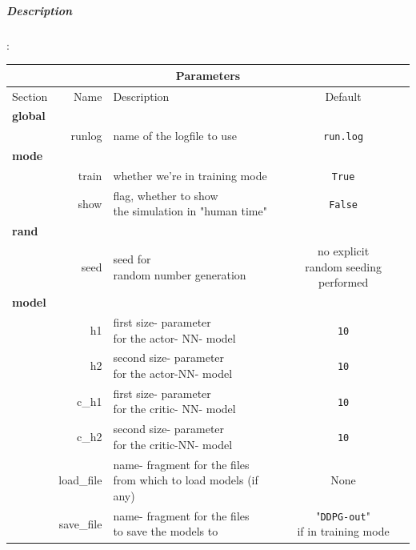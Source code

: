 \documentclass[a4paper]{article}
\begin{document}
\normalsize

\subparagraph{Description}
:\\
\small
\begin{tabular}{ |l|r|l|c| }
  \hline
  \multicolumn{4}{|c|}{Parameters} \\
  \hline
Section & Name & Description & Default \\
  \hline
\multicolumn{4}{|l|}{\textbf{global}} \\
               & runlog & name of the logfile to use & \texttt{run.log} \\
\multicolumn{4}{|l|}{\textbf{mode}} \\
               & train & whether we're in training mode & \texttt{True} \\
               & show & \makecell[tl]{flag, whether to show \\ the simulation in "human time"} & \texttt{False} \\
\multicolumn{4}{|l|}{\textbf{rand}} \\
               & seed & \makecell[tl]{seed for \\ random number generation} & \makecell[tc]{no explicit \\ random seeding performed} \\
\multicolumn{4}{|l|}{\textbf{model}} \\
               & h1 & \makecell[tl]{first size- parameter \\ for the actor- NN- model} & \texttt{10} \\
               & h2 & \makecell[tl]{second size- parameter \\ for the actor-NN- model} & \texttt{10} \\
               & c\_h1 & \makecell[tl]{first size- parameter \\ for the critic- NN- model} & \texttt{10} \\
               & c\_h2 & \makecell[tl]{second size- parameter \\ for the critic-NN- model} & \texttt{10} \\
               & load\_file & \makecell[tl]{name- fragment for the files \\ from which to load models (if any)} & None \\
               & save\_file & \makecell[tl]{name- fragment for the files \\ to save the models to} & \makecell[tc]{"\texttt{DDPG-out}" \\ if in training mode} \\

\end{tabular}
\end{document}
